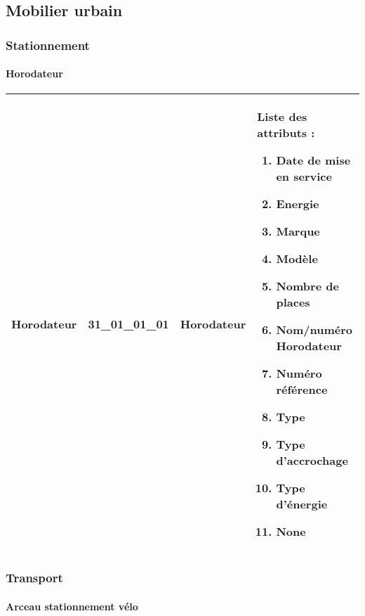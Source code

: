 \documentclass[12pt,titlepage,oneside]{book}
\begin{document}
\subsection{Mobilier urbain}
\subsubsection{\large Stationnement}
\paragraph{Horodateur}
\noindent
\vspace{\baselineskip}

\renewcommand{\arraystretch}{1.2}
\begin{supertabular}{|p{10cm}|c|p{13cm}|p{12cm}|}
 Horodateur & 31\_01\_01\_01 & Horodateur & Liste des attributs :
\begin{enumerate}
  \item Date de mise en service  \item Energie  \item Marque  \item Modèle  \item Nombre de places  \item Nom/numéro Horodateur  \item Numéro référence  \item Type  \item Type d'accrochage  \item Type d'énergie  \item None\end{enumerate}
\\
\hline
\end{supertabular}
\begin{figure}[h!]
  \hfill         %
\end{figure}

\subsubsection{\large Transport}
\paragraph{Arceau stationnement vélo}
\noindent
\vspace{\baselineskip}
\end{document}
